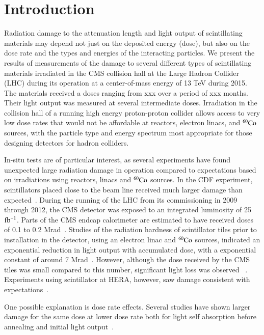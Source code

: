 \documentclass[review]{elsarticle}
\begin{document}
\linenumbers

\section{Introduction}
\label{sec:Introduction}
Radiation damage to the attenuation length and light output
of scintillating materials may depend not just on the deposited energy (dose),
but also on the dose rate and the types and energies of the interacting particles.
We present the
results of measurements of the damage to several different types
of scintillating materials irradiated in the CMS collision hall at the Large Hadron Collider (LHC) during its operation at a center-of-mass energy
of 13 TeV during 2015.
The materials received a doses ranging from {\color{red} xxx} over a period
of {\color{red} xxx} months.  Their light output was measured at several intermediate doses.
Irradiation in the collision hall of a running high energy
proton-proton collider allows access to very low dose rates that
would not be affordable at reactors, electron linacs,
and ${\rm ^{60}Co}$ sources, with the particle type and energy
spectrum most appropriate for those designing detectors for hadron colliders.


In-situ tests are of particular interest, as several experiments
have found unexpected large radiation damage in operation
compared to expectations
based on irradiations using reactors, linacs and ${\rm ^{60}Co}$ sources.
In the CDF experiment, scintillators
placed close to the
beam line received much larger damage than expected~\cite{Giokaris1993315}.
During the running of the LHC from its commissioning in 2009
through 2012, the CMS
detector was exposed to an integrated luminosity of 25 ${\rm fb^{-1}}$.  Parts of the
CMS endcap calorimeter are estimated to have received doses of 0.1 to 0.2 Mrad~\cite{ecfa2015}.
Studies of the radiation hardness of scintillator tiles
prior to installation in the detector,
using an electron linac and ${\rm ^{60}Co}$ sources,
indicated an exponential reduction in 
light output with accumulated dose, with a exponential constant of 
around 7 Mrad~\cite{vasken,ByonWagner1993263}.  
However, although the dose received by the CMS tiles was
small compared to this number,
significant light loss was observed ~\cite{phaseiitdr}.
Experiments using scintillator at HERA, however, saw damage
consistent with expectations~\cite{Bohnet:87278}.

One possible explanation is dose rate effects.
Several studies have shown larger damage for the same dose at lower dose
rate both for light self absorption before annealing and initial light output~\cite{sauli,34504,Wick1991472,289295,173180,173178,Giokaris1993315,Biagtan1996125}.
\end{document}
